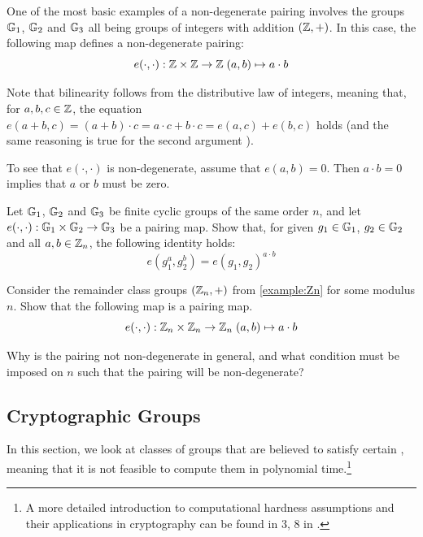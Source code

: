 \begin{example}
\label{example:integer_addition_pairing}
One of the most basic examples of a non-degenerate pairing involves the groups $\mathbb{G}_1$, $\mathbb{G}_2$ and $\mathbb{G}_3$ all being groups of integers with addition $(\mathbb{Z},+)$. In this case, the following map defines a non-degenerate pairing:
\begin{equation}
e(\cdot,\cdot): \mathbb{Z} \times \mathbb{Z} \to \mathbb{Z} \; (a,b)\mapsto a\cdot b
\end{equation}

Note that bilinearity follows from the distributive law of integers, meaning that, for $a,b,c\in \mathbb{Z}$, the equation $e(a+b,c)=(a+b)\cdot c = a\cdot c + b\cdot c = e(a,c)+ e(b,c)$ holds (and the same reasoning is true for the second argument ).

To see that $e(\cdot,\cdot)$ is non-degenerate, assume that $e(a,b)=0$. Then $a\cdot b =0$ implies that $a$ or $b$ must be zero.
\end{example}
\begin{exercise}
\label{ex:pairing-arithmetics} Let $\mathbb{G}_1$, $\mathbb{G}_2$ and $\mathbb{G}_3$ be finite cyclic groups of the same order $n$, and let $e(\cdot,\cdot): \mathbb{G}_1 \times \mathbb{G}_2 \to \mathbb{G}_3$ be a pairing map. Show that, for given $g_1\in \mathbb{G}_1$, $g_2\in \mathbb{G}_2$ and all $a,b\in \mathbb{Z}_n$, the following identity holds:
\begin{equation}
e(g_1^a, g_2^b) = e(g_1,g_2)^{a\cdot b}
\end{equation}
\end{exercise}
\begin{exercise} Consider the remainder class groups $(\mathbb{Z}_n,+)$ from \examplename{} \ref{example:Zn} for some modulus $n$. Show that the following map is a pairing map. 
\begin{equation}
e(\cdot,\cdot): \mathbb{Z}_n \times \mathbb{Z}_n \to \mathbb{Z}_n \; (a,b)\mapsto a\cdot b
\end{equation}

Why is the pairing not non-degenerate in general, and what condition must be imposed on $n$ such that the pairing will be non-degenerate?
\end{exercise}

\subsection{Cryptographic Groups}
\label{crypto_groups} In this section, we look at classes of groups that are believed to satisfy certain , meaning that it is not feasible to compute them in polynomial time.\footnote{A more detailed introduction to computational hardness assumptions and their applications in cryptography can be found in \chaptname{} 3, \secname{} 8 in \cite{katz-2007}.}

